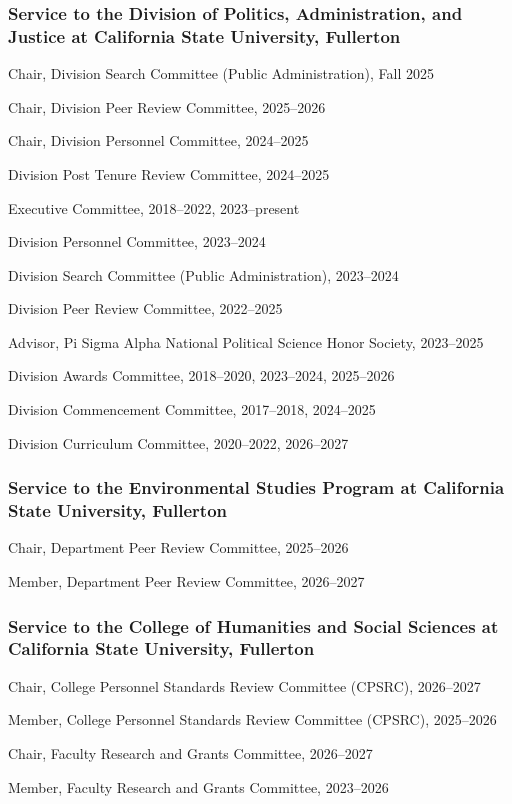 \documentclass[11pt,letterpaper]{article}
\renewenvironment{itemize}{
  \begin{list}{}{
    \setlength{\leftmargin}{1.5em}
    \setlength{\itemsep}{0.25em}
    \setlength{\parskip}{0pt}
    \setlength{\parsep}{0.25em}
  }
}{
  \end{list}
}
\begin{document}
\subsubsection*{Service to the Division of Politics, Administration, and Justice at California State University, Fullerton}
\begin{itemize}\leftmargin=2pt\itemindent=-15pt
    \item Chair, Division Search Committee (Public Administration), Fall 2025
    \item Chair, Division Peer Review Committee, 2025--2026
    \item Chair, Division Personnel Committee, 2024--2025
    \item Division Post Tenure Review Committee, 2024--2025
    \item Executive Committee, 2018--2022, 2023--present
    \item Division Personnel Committee, 2023--2024
    \item Division Search Committee (Public Administration), 2023--2024
    \item Division Peer Review Committee, 2022--2025
    \item Advisor, Pi Sigma Alpha National Political Science Honor Society, 2023--2025
    \item Division Awards Committee, 2018--2020, 2023--2024, 2025--2026
    \item Division Commencement Committee, 2017--2018, 2024--2025
    \item Division Curriculum Committee, 2020--2022, 2026--2027
\end{itemize}

\subsubsection*{Service to the Environmental Studies Program at California State University, Fullerton}
\begin{itemize}\leftmargin=2pt\itemindent=-15pt
    \item Chair, Department Peer Review Committee, 2025--2026
    \item Member, Department Peer Review Committee, 2026--2027
\end{itemize}

\subsubsection*{Service to the College of Humanities and Social Sciences at California State University, Fullerton}
\begin{itemize}\leftmargin=2pt\itemindent=-15pt
    \item Chair, College Personnel Standards Review Committee (CPSRC), 2026--2027
    \item Member, College Personnel Standards Review Committee (CPSRC), 2025--2026
    \item Chair, Faculty Research and Grants Committee, 2026--2027
    \item Member, Faculty Research and Grants Committee, 2023--2026
\end{itemize}
\end{document}
